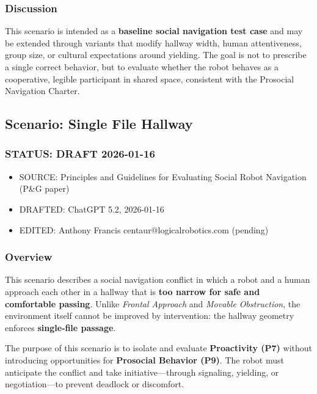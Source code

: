 \documentclass[utf8]{frontiers_suppmat} %
\providecommand{\tightlist}{%
  \setlength{\itemsep}{0pt}\setlength{\parskip}{0pt}}
\begin{document}
\subsubsection{Discussion}\label{discussion}

This scenario is intended as a \textbf{baseline social navigation test
case} and may be extended through variants that modify hallway width,
human attentiveness, group size, or cultural expectations around
yielding. The goal is not to prescribe a single correct behavior, but to
evaluate whether the robot behaves as a cooperative, legible participant
in shared space, consistent with the Prosocial Navigation Charter.

\subsection{Scenario: Single File
Hallway}\label{scenario-single-file-hallway}

\subsubsection{STATUS: DRAFT 2026-01-16}\label{status-draft-2026-01-16}

\begin{itemize}
\tightlist
\item
  SOURCE: Principles and Guidelines for Evaluating Social Robot
  Navigation (P\&G paper)
\item
  DRAFTED: ChatGPT 5.2, 2026-01-16
\item
  EDITED: Anthony Francis centaur@logicalrobotics.com (pending)
\end{itemize}

\subsubsection{Overview}\label{overview}

This scenario describes a social navigation conflict in which a robot
and a human approach each other in a hallway that is \textbf{too narrow
for safe and comfortable passing}. Unlike \emph{Frontal Approach} and
\emph{Movable Obstruction}, the environment itself cannot be improved by
intervention: the hallway geometry enforces \textbf{single‑file
passage}.

The purpose of this scenario is to isolate and evaluate
\textbf{Proactivity (P7)} without introducing opportunities for
\textbf{Prosocial Behavior (P9)}. The robot must anticipate the conflict
and take initiative---through signaling, yielding, or negotiation---to
prevent deadlock or discomfort.
\end{document}
